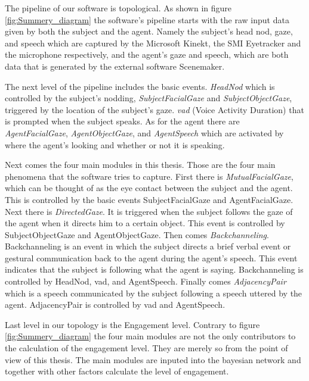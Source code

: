 \documentclass[12pt, a4paper, fleqn]{memoir}%
\begin{document}
The pipeline of our software is topological. As shown in figure \ref{fig:Summery_diagram} the software's pipeline starts with the raw input data given by both the subject and the agent. Namely the subject's head nod, gaze, and speech which are captured by the Microsoft Kinekt, the SMI Eyetracker and the microphone respectively, and the agent's gaze and speech, which are both data that is generated by the external software Scenemaker.

The next level of the pipeline includes the basic events. \textit{HeadNod} which is controlled by the subject's nodding, \textit{SubjectFacialGaze} and \textit{SubjectObjectGaze}, triggered by the location of the subject's gaze. \textit{vad} (Voice Activity Duration) that is prompted when the subject speaks. As for the agent there are \textit{AgentFacialGaze}, \textit{AgentObjectGaze}, and \textit{AgentSpeech} which are activated by where the agent's looking and whether or not it is speaking.

Next comes the four main modules in this thesis. Those are the four main phenomena that the software tries to capture. First there is \textit{MutualFacialGaze}, which can be thought of as the eye contact between the subject and the agent. This is controlled by the basic events SubjectFacialGaze and AgentFacialGaze. Next there is \textit{DirectedGaze}. It is triggered when the subject follows the gaze of the agent when it directs him to a certain object. This event is controlled by SubjectObjectGaze and AgentObjectGaze. Then comes \textit{Backchanneling}. Backchanneling is an event in which the subject directs a brief verbal event or gestural communication back to the agent during the agent's speech. This event indicates that the subject is following what the agent is saying. Backchanneling is controlled by HeadNod, vad, and AgentSpeech. Finally comes \textit{AdjacencyPair} which is a speech communicated by the subject following a speech uttered by the agent. AdjacencyPair is controlled by vad and AgentSpeech.

Last level in our topology is the Engagement level. Contrary to figure \ref{fig:Summery_diagram} the four main modules are not the only contributors to the calculation of the engagement level. They are merely so from the point of view of this thesis. The main modules are inputed into the bayesian network and together with other factors calculate the level of engagement.



\end{document}
